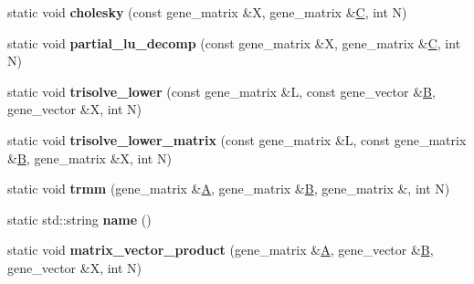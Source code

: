 \begin{DoxyCompactItemize}
static void {\bfseries cholesky} (const gene\+\_\+matrix \&X, gene\+\_\+matrix \&\hyperlink{group___core___module}{C}, int N)
\item 
\mbox{\label{classblas__interface_3_01_s_c_a_l_a_r_01_4_a7ab98665ec1c05460a2dbe30eef28e41}} 
static void {\bfseries partial\+\_\+lu\+\_\+decomp} (const gene\+\_\+matrix \&X, gene\+\_\+matrix \&\hyperlink{group___core___module}{C}, int N)
\item 
\mbox{\label{classblas__interface_3_01_s_c_a_l_a_r_01_4_a923077f46be0f34cbf9ef79f9f06a479}} 
static void {\bfseries trisolve\+\_\+lower} (const gene\+\_\+matrix \&L, const gene\+\_\+vector \&\hyperlink{group___core___module_class_eigen_1_1_matrix}{B}, gene\+\_\+vector \&X, int N)
\item 
\mbox{\label{classblas__interface_3_01_s_c_a_l_a_r_01_4_a3868699604ea5c8263d817b0ce4841e3}} 
static void {\bfseries trisolve\+\_\+lower\+\_\+matrix} (const gene\+\_\+matrix \&L, const gene\+\_\+matrix \&\hyperlink{group___core___module_class_eigen_1_1_matrix}{B}, gene\+\_\+matrix \&X, int N)
\item 
\mbox{\label{classblas__interface_3_01_s_c_a_l_a_r_01_4_ac921babcdbf03b5372bc2f5a927f79d2}} 
static void {\bfseries trmm} (gene\+\_\+matrix \&\hyperlink{group___core___module_class_eigen_1_1_matrix}{A}, gene\+\_\+matrix \&\hyperlink{group___core___module_class_eigen_1_1_matrix}{B}, gene\+\_\+matrix \&, int N)
\item 
\mbox{\label{classblas__interface_3_01_s_c_a_l_a_r_01_4_a7630e15565005b4ae7177f602019387d}} 
static std\+::string {\bfseries name} ()
\item 
\mbox{\label{classblas__interface_3_01_s_c_a_l_a_r_01_4_ac517f2bd1930982e653a4640bc386a1d}} 
static void {\bfseries matrix\+\_\+vector\+\_\+product} (gene\+\_\+matrix \&\hyperlink{group___core___module_class_eigen_1_1_matrix}{A}, gene\+\_\+vector \&\hyperlink{group___core___module_class_eigen_1_1_matrix}{B}, gene\+\_\+vector \&X, int N)
\item 
\mbox{\label{classblas__interface_3_01_s_c_a_l_a_r_01_4_a035b9344450c8fb70d82f71a3ff3d39d}} 

\end{DoxyCompactItemize}
